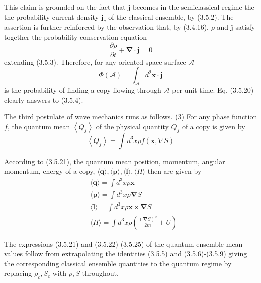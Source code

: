 \documentclass{article}
\begin{document}
This claim is grounded on the fact that $\boldsymbol{j}$ becomes in the semiclassical regime the the probability current density $\boldsymbol{j}_{c}$ of the classical ensemble, by (3.5.2). The assertion is further reinforced by the observation that, by (3.4.16), $\rho$ and $\boldsymbol{j}$ satisfy together the probability conservation equation
$$
\begin{equation*}
\frac{\partial \rho}{\partial t}+\boldsymbol{\nabla} \cdot \boldsymbol{j}=0 \tag{3.5.19}
\end{equation*}
$$
extending (3.5.3). Therefore, for any oriented space surface $\mathcal{A}$
$$
\begin{equation*}
\Phi(\mathcal{A})=\int_{\mathcal{A}} d^{2} \boldsymbol{x} \cdot \boldsymbol{j} \tag{3.5.20}
\end{equation*}
$$
is the probability of finding a copy flowing through $\mathcal{A}$ per unit time. Eq. (3.5.20) clearly answers to (3.5.4).

The third postulate of wave mechanics runs as follows.
(3) For any phase function $f$, the quantum mean $\left\langle Q_{f}\right\rangle$ of the physical quantity $Q_{f}$ of a copy is given by
$$
\begin{equation*}
\left\langle Q_{f}\right\rangle=\int d^{3} x \rho f(\boldsymbol{x}, \nabla S) \tag{3.5.21}
\end{equation*}
$$

According to (3.5.21), the quantum mean position, momentum, angular momentum, energy of a copy, $\langle\boldsymbol{q}\rangle,\langle\boldsymbol{p}\rangle,\langle\boldsymbol{l}\rangle,\langle H\rangle$ then are given by
$$
\begin{align*}
& \langle\boldsymbol{q}\rangle=\int d^{3} x \rho \boldsymbol{x}  \tag{3.5.22}\\
& \langle\boldsymbol{p}\rangle=\int d^{3} x \rho \boldsymbol{\nabla} S  \tag{3.5.23}\\
& \langle\boldsymbol{l}\rangle=\int d^{3} x \rho \boldsymbol{x} \times \boldsymbol{\nabla} S  \tag{3.5.24}\\
& \langle H\rangle=\int d^{3} x \rho\left(\frac{(\boldsymbol{\nabla} S)^{2}}{2 m}+U\right) \tag{3.5.25}
\end{align*}
$$

The expressions (3.5.21) and (3.5.22)-(3.5.25) of the quantum ensemble mean values follow from extrapolating the identities (3.5.5) and (3.5.6)-(3.5.9) giving the corresponding classical ensemble quantities to the quantum regime by replacing $\rho_{c}, S_{c}$ with $\rho, S$ throughout.
\end{document}
